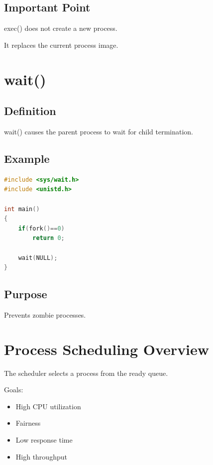 \subsection{Important Point}

exec() does not create a new process.

It replaces the current process image.

\section{wait()}

\subsection{Definition}

wait() causes the parent process to wait for child termination.

\subsection{Example}

\begin{lstlisting}[language=C]
#include <sys/wait.h>
#include <unistd.h>

int main()
{
    if(fork()==0)
        return 0;

    wait(NULL);
}
\end{lstlisting}

\subsection{Purpose}

Prevents zombie processes.

\section{Process Scheduling Overview}

The scheduler selects a process from the ready queue.

Goals:

\begin{itemize}
\item High CPU utilization
\item Fairness
\item Low response time
\item High throughput
\end{itemize}

